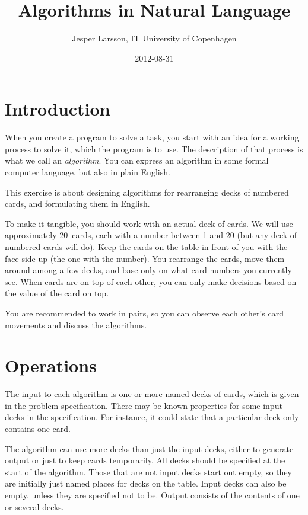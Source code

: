 \documentclass[a4paper,twoside]{tufte-handout}
\title{Algorithms in Natural Language}
\author{Jesper Larsson, IT University of Copenhagen}
\date{2012-08-31}
\begin{document}
\maketitle

\section{Introduction}\label{sec-intro}

When you create a program to solve a task, you start with an idea for
a working process to solve it, which the program is to use. The
description of that process is what we call an \emph{algorithm}. You
can express an algorithm in some formal computer language, but also in
plain English.

This exercise is about designing algorithms for rearranging decks of
numbered cards, and formulating them in English.

To make it tangible, you should work with an actual deck of cards. We
will use approximately 20~cards, each with a number between 1 and 20
(but any deck of numbered cards will do). Keep the cards on the table
in front of you with the face side up (the one with the number). You
rearrange the cards, move them around among a few decks, and base
only on what card numbers you currently see. When
cards are on top of each other, you can only make decisions based on
the value of the card on top.

You are recommended to work in pairs, so you can observe each
other's card movements and discuss the algorithms.

\section{Operations}\label{sec-ops}

The input to each algorithm is one or more named decks of cards, which
is given in the problem specification. There may be known properties
for some input decks in the specification. For instance, it could
state that a particular deck only contains one card.

The algorithm can use more decks than just the input decks, either to
generate output or just to keep cards temporarily. All decks should be
specified at the start of the algorithm. Those that are not input
decks start out empty, so they are initially just named places for
decks on the table. Input decks can also be empty, unless they are specified
not to be. Output consists of the contents of one or several decks.
\end{document}
